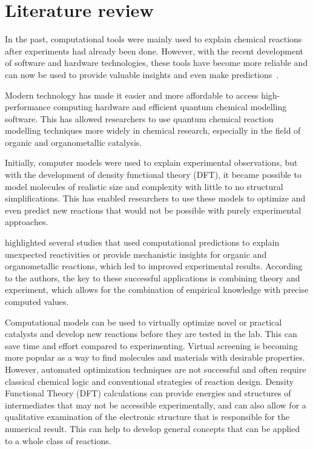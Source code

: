 \chapter{Literature review}%
\label{ch:lit-review}

In the past,
computational tools were mainly used to explain chemical reactions after experiments had already been done.
However,
with the recent development of software and hardware technologies,
these tools have become more reliable and can now be used to provide valuable insights and even make predictions~\cite{Ahn_2019}.

Modern technology has made it easier and more affordable to access high-performance computing hardware and efficient quantum chemical modelling software.
This has allowed researchers to use quantum chemical reaction modelling techniques more widely in chemical research,
especially in the field of organic and organometallic catalysis.

Initially,
computer models were used to explain experimental observations,
but with the development of density functional theory (DFT),
it became possible to model molecules of realistic size and complexity with little to no structural simplifications.
This has enabled researchers to use these models to optimize and even predict new reactions that would not be possible with purely experimental approaches.

\citeauthor{Ahn_2019} highlighted several studies that used computational predictions to explain unexpected reactivities or provide mechanistic insights for organic and organometallic reactions,
which led to improved experimental results.
According to the authors,
the key to these successful applications is combining theory and experiment,
which allows for the combination of empirical knowledge with precise computed values\cite{Ahn_2019}.

Computational models can be used to virtually optimize novel or practical catalysts and develop new reactions before they are tested in the lab.
This can save time and effort compared to experimenting.
Virtual screening is becoming more popular as a way to find molecules and materials with desirable properties.
However,
automated optimization techniques are not successful and often require classical chemical logic and conventional strategies of reaction design.
Density Functional Theory (DFT) calculations can provide energies and structures of intermediates that may not be accessible experimentally,
and can also allow for a qualitative examination of the electronic structure that is responsible for the numerical result.
This can help to develop general concepts that can be applied to a whole class of reactions.

